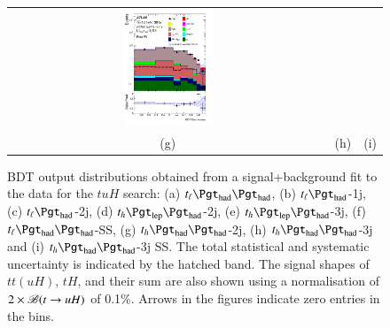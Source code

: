 \begin{figure}[H]
\begin{tabular}{@{}ccc@{}}
\includegraphics[width=0.29\textwidth]{figures/BDT/tuH_reg2mtau1b3jss.pdf}\\
(g) & (h)  & (i) \\
\end{tabular}
\caption{ BDT output distributions obtained from a signal+background fit to the data for the $tuH$ search: 
(a) $t_{\ell}\thadhad$, (b) $t_{\ell}\tauhad$-1j,  (c) $t_{\ell}\tauhad$-2j, (d) $t_h\tlhad$-2j, (e) $t_h\tlhad$-3j, (f) $t_{\ell}\thadhad$-SS, (g) $t_h\thadhad$-2j, (h) $t_h\thadhad$-3j and (i) $t_h\thadhad$-3j SS.  
The total statistical and systematic uncertainty is indicated by the hatched band. The signal shapes of $tt(uH)$, $tH$, and their sum are also shown using a normalisation of $2 \times\mathscr{B}(t\rightarrow uH)$ of 0.1\%. Arrows in the figures indicate zero entries in the bins.
}
\label{fig:asimov_postfitbdtHu}
\end{figure}



